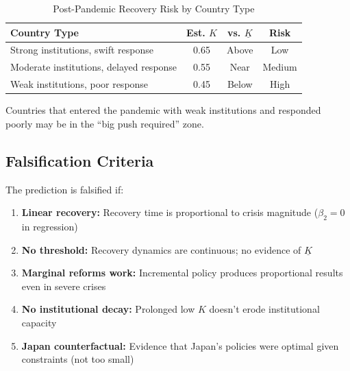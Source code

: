 \begin{table}[htbp]
\centering
\caption{Post-Pandemic Recovery Risk by Country Type}
\label{tab:pandemic-risk}
\begin{tabular}{@{}lccc@{}}
\toprule
\textbf{Country Type} & \textbf{Est. $K$} & \textbf{vs. $\underline{K}$} & \textbf{Risk} \\
\midrule
Strong institutions, swift response & 0.65 & Above & Low \\
Moderate institutions, delayed response & 0.55 & Near & Medium \\
Weak institutions, poor response & 0.45 & Below & High \\
\bottomrule
\end{tabular}
\end{table}

Countries that entered the pandemic with weak institutions and responded 
poorly may be in the ``big push required'' zone.

\subsection{Falsification Criteria}

The prediction is falsified if:

\begin{enumerate}
    \item \textbf{Linear recovery:} Recovery time is proportional to crisis 
    magnitude ($\beta_2 = 0$ in regression)
    
    \item \textbf{No threshold:} Recovery dynamics are continuous; no evidence 
    of $\underline{K}$
    
    \item \textbf{Marginal reforms work:} Incremental policy produces proportional 
    results even in severe crises
    
    \item \textbf{No institutional decay:} Prolonged low $K$ doesn't erode 
    institutional capacity
    
    \item \textbf{Japan counterfactual:} Evidence that Japan's policies were 
    optimal given constraints (not too small)
\end{enumerate}


